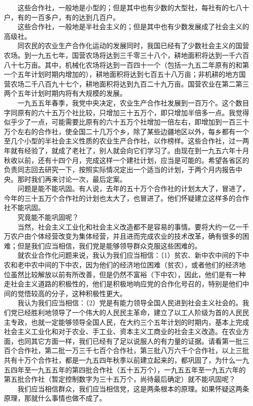 \documentclass[cn,11pt,chinese]{elegantbook}
\begin{document}
　　这些合作社，一般地是小型的；但是其中也有少数的大型社，每社有的七八十户，有的一百多户，有的达到几百户。\\
　　这些合作社，一般地是半社会主义的；但是其中也有少数发展成了社会主义的高级社。\\
　　同农民的农业生产合作化运动的发展同时，我国已经有了少数社会主义的国营农场。到一九五七年，国营农场将达到三千零三十八个，耕地面积将达到一千六百八十七万亩。其中，机械化农场将达到一百四十一个（包括一九五二年原有的和第一个五年计划时期内增加的），耕地面积将达到七百五十八万亩；非机耕的地方国营农场二千八百九十七个，耕地面积将达到九百二十九万亩。国营农业在第二第三两个五年计划时期内将有大规模的发展。\\
　　一九五五年春季，我党中央决定，农业生产合作社发展到一百万个。这个数目字同原有的六十五万个社比较，只增加三十五万个，即只增加半倍多一点。我觉得似乎少了一点，可能需要比原有的六十五万个社增加一倍左右，即增加到一百三十万个左右的合作社，使全国二十几万个乡，除了某些边疆地区以外，每乡都有一个至几个小型的半社会主义性质的农业生产合作社，以作榜样。这些合作社，过一两年就有经验了，就成了老社了，别人就会向它们学习了。由现在到一九五六年十月秋收以前，还有十四个月，完成这样一个建社计划，应当是可能的。希望各省区的负责同志回去研究一下，按照实际情况定出一个适当的计划，于两个月内报告中央。那时我们再来讨论一次，最后定案。\\
　　问题是能不能巩固。有人说，去年的五十万个合作社的计划太大了，冒进了，今年的三十五万个合作社的计划也太大了，也冒进了。他们怀疑建立这样多的合作社不能巩固。\\
　　究竟能不能巩固呢？\\
　　当然，社会主义工业化和社会主义改造都不是容易的事情。要将大约一亿一千万农户由个体经营改变为集体经营，并且进而完成农业的技术改革，确有很多的困难；但是我们应当相信，我们党是能够领导群众克服这些困难的。\\
　　就农业合作化问题来说，我认为我们应当相信：（1）贫农、新中农中间的下中农和老中农中间的下中农，因为他们的经济地位困难（贫农），或者他们的经济地位虽然比较解放以前有所改善，但是仍然不富裕（下中农），因此，他们是有一种走社会主义道路的积极性的，他们是积极地响应党的合作化号召的，特别是他们中间的觉悟较高的分子，这种积极性更大。\\
　　我认为我们应当相信：（2）党是有能力领导全国人民进到社会主义社会的。我们党已经胜利地领导了一个伟大的人民民主革命，建立了以工人阶级为首的人民民主专政，也就一定能够领导全国人民，在大约三个五年计划的时期内，基本上完成社会主义工业化和对于农业、手工业、资本主义工商业的社会主义改造。在农业方面，也同其它方面一样，我们已经有了足以说服人的有力量的证据。请看第一批三百个合作社，第二批一万三千七百个合作社，第三批八万六千个合作社，以上三批共有十万个合作社，都是一九五四年秋季以前建立起来的，都巩固了，为什么一九五四年至一九五五年的第四批合作社（五十五万个），一九五五年至一九五六年的第五批合作社（暂定控制数字为三十五万个，尚待最后确定）就不能巩固呢？\\
　　我们应当相信群众，我们应当相信党，这是两条根本的原理。如果怀疑这两条原理，那就什么事情也做不成了。\\
\end{document}

